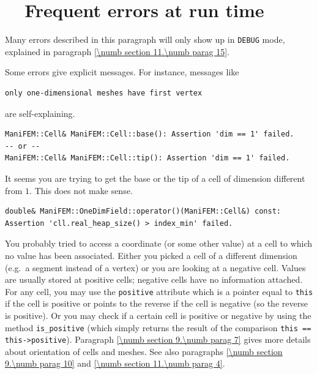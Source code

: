 \section{~~Frequent errors at run time}\label{\numb section 11.\numb parag 14}

Many errors described in this paragraph will only show up in {\small\tt DEBUG} mode,
explained in paragraph \ref{\numb section 11.\numb parag 15}.

Some errors give explicit messages. For instance, messages like

\begin{Verbatim}[commandchars=\\\{\},formatcom=\small\tt,baselinestretch=0.94]
only one-dimensional meshes have first vertex
\end{Verbatim}

\noindent are self-explaining.

\begin{Verbatim}[commandchars=\\\{\},formatcom=\small\tt,baselinestretch=0.94]
ManiFEM::Cell& ManiFEM::Cell::base(): Assertion 'dim == 1' failed.
-- or --
ManiFEM::Cell& ManiFEM::Cell::tip(): Assertion 'dim == 1' failed.
\end{Verbatim}

It seems you are trying to get the base or the tip of a cell of dimension
different from $1$.
This does not make sense.

\begin{Verbatim}[commandchars=\\\{\},formatcom=\small\tt,baselinestretch=0.94]
double& ManiFEM::OneDimField::operator()(ManiFEM::Cell&) const:
Assertion 'cll.real_heap_size() > index_min' failed.
\end{Verbatim}

You probably tried to access a coordinate (or some other value) at a cell to which 
no value has been associated.
Either you picked a cell of a different dimension (e.g.\ a segment instead of a
vertex) or you are looking at a negative cell.
Values are usually stored at positive cells; negative cells have no information attached.
For any cell, you may use the {\small\tt positive} attribute which is a pointer
equal to {\small\tt this} if the cell is positive or points to the reverse if
the cell is negative (so the reverse is positive).
Or you may check if a certain cell is positive or negative by using the method
{\small\tt is\_positive} (which simply returns the result of the comparison
{\small\tt this == this->positive}).
Paragraph \ref{\numb section 9.\numb parag 7} gives more details about orientation of
cells and meshes.
See also paragraphs \ref{\numb section 9.\numb parag 10} and
\ref{\numb section 11.\numb parag 4}.

